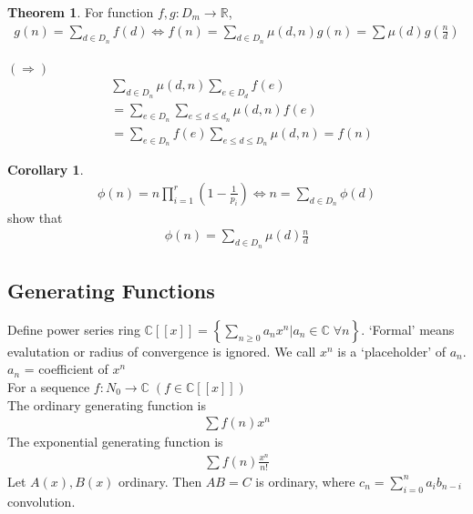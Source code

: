 \documentclass{article}
\theoremstyle{definition}
\newtheorem{thm}{Theorem}[]
\newtheorem{cor}{Corollary}
\newenvironment{pf*}{\pushQED{\qed}\pf}{\popQED\endpf}
\begin{document}
\begin{thm}
    For function $f, g : D_m \rightarrow \mathbb{R}$,
    \begin{align*}
        g(n) = \sum_{d\in D_n} f(d) \Leftrightarrow 
        f(n) = \sum_{d \in D_n} \mu (d, n) g(n) = \sum \mu (d) g(\frac{n}{d})
    \end{align*}
\end{thm}
\begin{pf*} $( \Rightarrow )$
    \begin{align*}
        &\sum_{d\in D_n} \mu (d, n) \sum_{e \in D_d} f(e) \\
        &= \sum_{e\in D_n} \sum_{e \le d \le d_n} \mu (d, n) f(e) \\ 
        &= \sum_{e \in D_n} f(e) \sum_{e \le d \le D_n} \mu (d, n) = f(n) 
    \end{align*}
\end{pf*}
\begin{cor}
    \begin{align*}
        \phi (n) = n \prod_{i=1}^{r} \left(1 - \frac{1}{p_i}\right) 
        \Leftrightarrow n = \sum_{d \in D_n} \phi (d)
    \end{align*}
    show that
    \begin{align*}
        \phi (n) = \sum_{d \in D_n} \mu (d) \frac{n}{d}
    \end{align*}
\end{cor}
\subsection{Generating Functions}
Define power series ring $\mathbb{C} [[x]] = \left\{ \sum_{n \ge 0} a_n x^n \vert 
a_n \in \mathbb{C}\; \forall n  \right\}$. `Formal' means evalutation or 
radius of convergence is ignored. We call $x^n$ is a `placeholder' of $a_n$.
$a_n$ = coefficient of $x^n$\\
For a sequence $f : N_0 \rightarrow \mathbb{C} \; \left(f \in \mathbb{C}[[x]]\right)$ \\ 
The ordinary generating function is 
\begin{align*}
    \sum f(n) x^n
\end{align*}
The exponential generating function is 
\begin{align*}
    \sum f(n) \frac{x^n}{n!}
\end{align*}
Let $A(x), B(x)$ ordinary. Then $AB = C$ is ordinary, where $c_n = 
\sum_{i=0}^n a_i b_{n-i}$ convolution. \\
\end{document}
